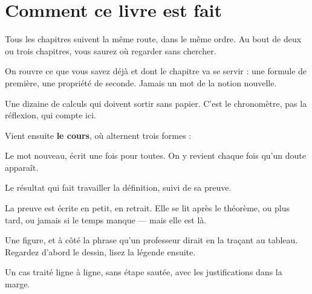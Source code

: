 \chapter*{Comment ce livre est fait}

Tous les chapitres suivent la même route, dans le même ordre. Au bout de deux
ou trois chapitres, vous saurez où regarder sans chercher.

\vspace{0.8em}

\begin{revision}
On rouvre ce que vous savez déjà et dont le chapitre va se servir : une
formule de première, une propriété de seconde. Jamais un mot de la notion
nouvelle.
\end{revision}

\begin{automatismes}
Une dizaine de calculs qui doivent sortir sans papier. C'est le
chronomètre, pas la réflexion, qui compte ici.
\end{automatismes}

\noindent Vient ensuite \textbf{le cours}, où alternent trois formes :

\begin{definition}[Ce qu'on pose]
Le mot nouveau, écrit une fois pour toutes. On y revient chaque fois qu'un
doute apparaît.
\end{definition}

\begin{theoreme}[Ce qu'on démontre]
Le résultat qui fait travailler la définition, suivi de sa preuve.
\end{theoreme}

\begin{demonstration}
La preuve est écrite en petit, en retrait. Elle se lit après le théorème, ou
plus tard, ou jamais si le temps manque — mais elle est là.
\end{demonstration}

\begin{visualisation}
Une figure, et à côté la phrase qu'un professeur dirait en la traçant au
tableau. Regardez d'abord le dessin, lisez la légende ensuite.
\end{visualisation}

\begin{exemple}
Un cas traité ligne à ligne, sans étape sautée, avec les justifications dans
la marge.
\end{exemple}

